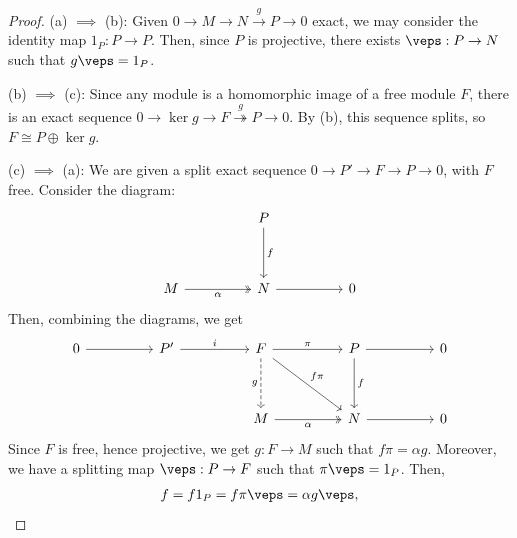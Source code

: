 \begin{proof}
    \hfill

    (a) $\implies$ (b): Given $0 \to M \to N \overset{g}{\to} P \to 0$ exact, we may consider the identity map $1_P:P \to P$. Then, since $P$ is projective, there exists $\veps : P \to N$ such that $g\veps = 1_P$.

    (b) $\implies$ (c): Since any module is a homomorphic image of a free module $F$, there is an exact sequence $0\to \ker g \to F \overset{g}{\twoheadrightarrow} P \to 0$. By (b), this sequence splits, so $F \cong P \oplus \ker g$.

    (c) $\implies$ (a): We are given a split exact sequence $0 \to P' \to F \to P \to 0$, with $F$ free. Consider the diagram:
\[\begin{tikzcd}[ampersand replacement=\&]
	\&\& P \&\& \\
	\\
	M \&\& N \&\& 0
	\arrow["f", from=1-3, to=3-3]
	\arrow["\alpha"', two heads, from=3-1, to=3-3]
	\arrow[from=3-3, to=3-5]
\end{tikzcd}\]
Then, combining the diagrams, we get
\[\begin{tikzcd}[ampersand replacement=\&]
	0 \&\& {P'} \&\& F \&\& P \&\& 0 \\
	\\
	\&\&\&\& M \&\& N \&\& 0
	\arrow[from=1-1, to=1-3]
	\arrow["i", from=1-3, to=1-5]
	\arrow["\pi", from=1-5, to=1-7]
	\arrow["g"', dashed, from=1-5, to=3-5]
	\arrow["{f\pi}", from=1-5, to=3-7]
	\arrow[from=1-7, to=1-9]
	\arrow["f", from=1-7, to=3-7]
	\arrow["\alpha"', two heads, from=3-5, to=3-7]
	\arrow[from=3-7, to=3-9]
\end{tikzcd}\]
Since $F$ is free, hence projective, we get $g:F \to M$ such that $f\pi = \alpha g$. Moreover, we have a splitting map $\veps:P \to F$ such that $\pi \veps = 1_P$. Then,
\begin{align*}
    f=f1_P=f\pi \veps=\alpha g \veps,
\end{align*}

\end{proof}
